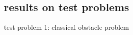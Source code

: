 \documentclass[svgnames,
               hyperref={colorlinks,citecolor=DeepPink4,linkcolor=FireBrick,urlcolor=Maroon},
               usepdftitle=false]  %
               {beamer}
\begin{document}
\subsection{results on test problems}

\begin{frame}{test problem 1: classical obstacle problem}


\end{frame}
\end{document}
